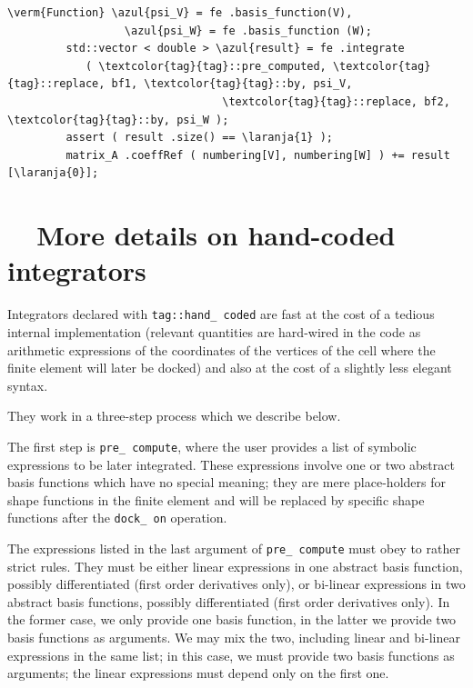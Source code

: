 \begin{Verbatim}[commandchars=\\\{\},formatcom=\small\tt,frame=single,
   label=parag-\ref{\numb section 6.\numb parag 10}.cpp,rulecolor=\color{moldura},
   baselinestretch=0.94,framesep=2mm                                            ]
         \verm{Function} \azul{psi_V} = fe .basis_function(V),
                  \azul{psi_W} = fe .basis_function (W);
         std::vector < double > \azul{result} = fe .integrate 
            ( \textcolor{tag}{tag}::pre_computed, \textcolor{tag}{tag}::replace, bf1, \textcolor{tag}{tag}::by, psi_V,
                                 \textcolor{tag}{tag}::replace, bf2, \textcolor{tag}{tag}::by, psi_W );
         assert ( result .size() == \laranja{1} );
         matrix_A .coeffRef ( numbering[V], numbering[W] ) += result [\laranja{0}];
\end{Verbatim}

\section{~~More details on hand-coded integrators}\label{\numb section 6.\numb parag 11}

Integrators declared with {\small\tt\textcolor{tag}{tag}::hand\_\,coded} are fast at the
cost of a tedious internal implementation (relevant quantities are hard-wired in the code
as arithmetic expressions of the coordinates of the vertices of the cell where the
finite element will later be docked) and also at the cost of a slightly less elegant syntax.

They work in a three-step process which we describe below.

The first step is {\small\tt pre\_\,compute}, where the user provides a list of symbolic
expressions to be later integrated.
These expressions involve one or two abstract basis functions which have no special meaning;
they are mere place-holders for shape functions in the finite element and will be replaced
by specific shape functions after the {\small\tt dock\_\,on} operation.

The expressions listed in the last argument of {\small\tt pre\_\,compute} must obey to
rather strict rules.
They must be either linear expressions in one abstract basis function, possibly differentiated
(first order derivatives only), or bi-linear expressions in two abstract basis functions,
possibly differentiated (first order derivatives only).
In the former case, we only provide one basis function, in the latter we provide two basis
functions as arguments.
We may mix the two, including linear and bi-linear expressions in the same list;
in this case, we must provide two basis functions as arguments;
the linear expressions must depend only on the first one.

